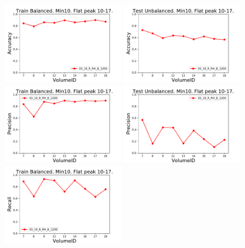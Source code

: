 \begin{figure}[t]
\centering
\includegraphics[width=0.45\textwidth]{plots/plot_03_1_overlay_graph_Accuracy_VolumeID_Train.pdf}
\includegraphics[width=0.45\textwidth]{plots/plot_03_1_overlay_graph_Accuracy_VolumeID_Test.pdf}\\
\includegraphics[width=0.45\textwidth]{plots/plot_03_1_overlay_graph_Precision_VolumeID_Train.pdf}
\includegraphics[width=0.45\textwidth]{plots/plot_03_1_overlay_graph_Precision_VolumeID_Test.pdf}\\
\includegraphics[width=0.45\textwidth]{plots/plot_03_1_overlay_graph_Recall_VolumeID_Train.pdf}

\end{figure}
